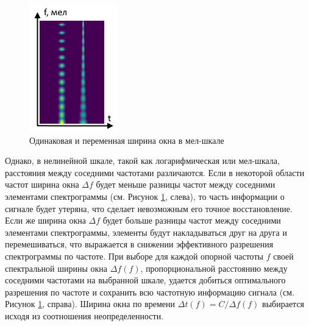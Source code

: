 \begin{figure}
  \includegraphics[width=0.9\linewidth]{figures/windows_mel}
  \caption{Одинаковая и переменная ширина окна в мел-шкале}
  \label{fig:windows_mel}
\end{figure}

Однако, в нелинейной шкале, такой как логарифмическая или мел-шкала, расстояния между соседними частотами различаются. 
Если в некоторой области частот ширина окна $\Delta f$ будет меньше разницы частот между соседними элементами спектрограммы (см. Рисунок \ref{fig:windows_mel}, слева),
то часть информации о сигнале будет утеряна, что сделает невозможным его точное восстановление.
Если же ширина окна $\Delta f$ будет больше разницы частот между соседними элементами спектрограммы, 
элементы будут накладываться друг на друга и перемешиваться,
что выражается в снижении эффективного разрешения спектрограммы по частоте.
При выборе для каждой опорной частоты $f$ своей спектральной ширины окна $\Delta f(f)$, пропорциональной расстоянию между соседними частотами на выбранной шкале, 
удается добиться оптимального разрешения по частоте и сохранить всю частотную информацию сигнала (см. Рисунок \ref{fig:windows_mel}, справа). 
Ширина окна по времени $\Delta t(f) = C / \Delta f(f)$ выбирается исходя из соотношения неопределенности.


